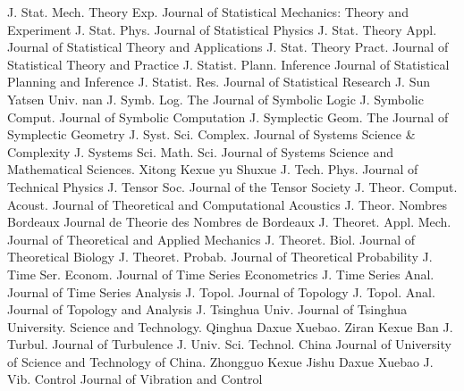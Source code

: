 {J. Stat. Mech. Theory Exp.}
{Journal of Statistical Mechanics: Theory and Experiment}
{J. Stat. Phys.}
{Journal of Statistical Physics}
{J. Stat. Theory Appl.}
{Journal of Statistical Theory and Applications}
{J. Stat. Theory Pract.}
{Journal of Statistical Theory and Practice}
{J. Statist. Plann. Inference}
{Journal of Statistical Planning and Inference}
{J. Statist. Res.}
{Journal of Statistical Research}
{J. Sun Yatsen Univ.}
{nan}
{J. Symb. Log.}
{The Journal of Symbolic Logic}
{J. Symbolic Comput.}
{Journal of Symbolic Computation}
{J. Symplectic Geom.}
{The Journal of Symplectic Geometry}
{J. Syst. Sci. Complex.}
{Journal of Systems Science & Complexity}
{J. Systems Sci. Math. Sci.}
{Journal of Systems Science and Mathematical Sciences. Xitong Kexue yu Shuxue}
{J. Tech. Phys.}
{Journal of Technical Physics}
{J. Tensor Soc.}
{Journal of the Tensor Society}
{J. Theor. Comput. Acoust.}
{Journal of Theoretical and Computational Acoustics}
{J. Theor. Nombres Bordeaux}
{Journal de Theorie des Nombres de Bordeaux}
{J. Theoret. Appl. Mech.}
{Journal of Theoretical and Applied Mechanics}
{J. Theoret. Biol.}
{Journal of Theoretical Biology}
{J. Theoret. Probab.}
{Journal of Theoretical Probability}
{J. Time Ser. Econom.}
{Journal of Time Series Econometrics}
{J. Time Series Anal.}
{Journal of Time Series Analysis}
{J. Topol.}
{Journal of Topology}
{J. Topol. Anal.}
{Journal of Topology and Analysis}
{J. Tsinghua Univ.}
{Journal of Tsinghua University. Science and Technology. Qinghua Daxue Xuebao. Ziran Kexue Ban}
{J. Turbul.}
{Journal of Turbulence}
{J. Univ. Sci. Technol. China}
{Journal of University of Science and Technology of China. Zhongguo Kexue Jishu Daxue Xuebao}
{J. Vib. Control}
{Journal of Vibration and Control}
